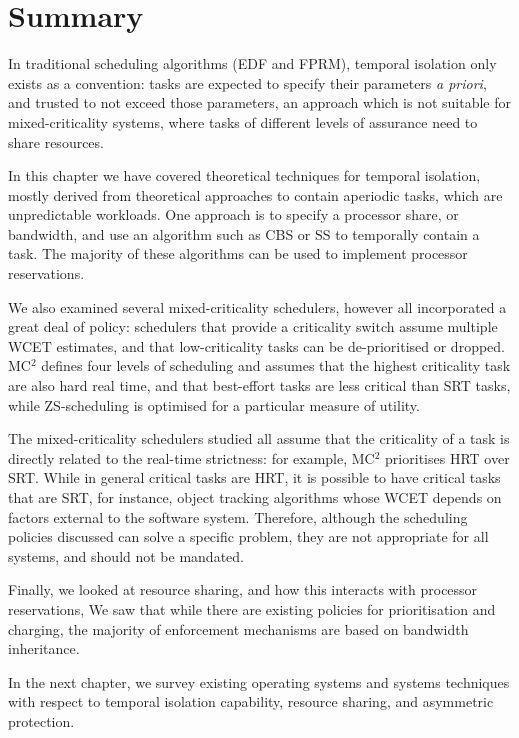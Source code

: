 \section{Summary}

In traditional scheduling algorithms (\gls{EDF} and \gls{FPRM}), temporal isolation only exists as a
convention: tasks are expected to specify their parameters \emph{a priori}, and trusted to not
exceed those parameters, an approach which is not suitable for mixed-criticality systems, where
tasks of different levels of assurance need to share resources.

In this chapter we have covered theoretical techniques for temporal isolation, mostly derived from 
theoretical approaches to contain aperiodic tasks, which are unpredictable workloads. One approach
is to specify a processor share, or bandwidth, and use an algorithm such as \gls{CBS} or \gls{SS} to 
temporally contain a task. The majority of these algorithms can be used to implement processor
reservations.

We also examined several mixed-criticality schedulers, however all incorporated a great deal of
policy: schedulers that provide a criticality switch assume multiple \gls{WCET} estimates, and
that low-criticality tasks can be de-prioritised or dropped. MC$^2$ defines four levels of
scheduling and assumes that the highest criticality task are also hard real time, and that
best-effort tasks are less critical than \gls{SRT} tasks, while \gls{ZS}-scheduling is optimised for
a particular measure of utility. 

The mixed-criticality schedulers studied all assume that the criticality of a task is directly
related to the real-time strictness: for example, MC$^2$ prioritises \gls{HRT} over \gls{SRT}. 
While in
general critical tasks are \gls{HRT}, it is possible to have critical tasks that are \gls{SRT}, for
instance, object tracking algorithms whose \gls{WCET} depends on factors external to the software
system. Therefore, although the scheduling policies discussed can solve a specific problem, they are
not appropriate for all systems, and should not be mandated.

Finally, we looked at resource sharing, and how this interacts with processor reservations,
We saw that while there are existing policies for prioritisation and charging, the
majority of enforcement mechanisms are based on bandwidth inheritance. 

In the next chapter, we survey existing operating systems and systems techniques with respect to
temporal isolation capability, resource sharing, and asymmetric protection.
